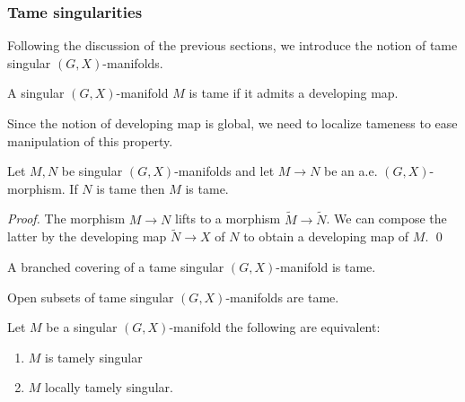 \subsubsection{Tame singularities}


Following the discussion of the previous sections, we introduce the notion of tame singular $(G,X)$-manifolds. 
\begin{defi}
 A singular $(G,X)$-manifold $M$ is tame if it admits a  developing map.
\end{defi}
Since the notion of developing map is global, we need to localize tameness to ease manipulation of this property.

\begin{lem}\label{lem:embedding_tame}
Let $M,N$ be singular $(G,X)$-manifolds and let $M\rightarrow N$ be an a.e. $(G,X)$-morphism. If $N$ is tame then $M$ is tame.
\end{lem}
\begin{proof}
 The morphism $M\rightarrow N$ lifts to a morphism $\widetilde M\rightarrow \widetilde N$. We can compose the latter by the developing map $\widetilde N \rightarrow X$ of $N$ to obtain a developing map of $M$. 
\qed\end{proof}
\begin{cor} A branched covering of a tame  singular $(G,X)$-manifold is tame.
\end{cor}
\begin{cor} Open subsets of tame singular $(G,X)$-manifolds are tame.
\end{cor}



\begin{thm} \label{theo:local_tame}  Let $M$ be a singular $(G,X)$-manifold the following are equivalent:
\begin{enumerate}
 \item $M$ is tamely singular 
 \item $M$ locally tamely singular.
\end{enumerate}



\end{thm}



